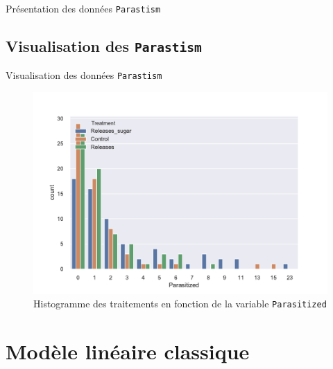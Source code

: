 \documentclass[aspectratio=1610]{beamer}
\begin{document}
\begin{frame}{Présentation des données \texttt{Parastism}}
\begin{figure}[!h]
\end{figure}	

\end{frame}

\subsection{Visualisation des \texttt{Parastism}}
\begin{frame}{Visualisation des données \texttt{Parastism}}
 \begin{figure}[h]
\centering
 \includegraphics[width=.7\textwidth]{Histogram of the count.pdf}
 \caption{Histogramme des traitements en fonction de la variable \texttt{Parasitized} } 
 \label{hist_para}
 \end{figure}

\end{frame}




\section{Modèle linéaire classique}
\end{document}
